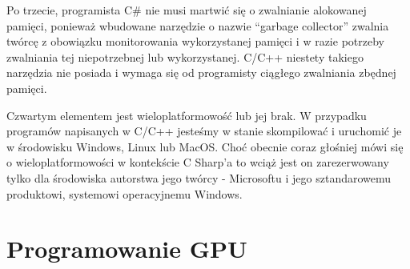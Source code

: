 \documentclass{article}
\begin{document}
	\par
	Po trzecie, programista C# nie musi martwić się o zwalnianie alokowanej pamięci, ponieważ wbudowane narzędzie o nazwie “garbage collector” zwalnia twórcę z obowiązku monitorowania wykorzystanej pamięci i w razie potrzeby zwalniania tej niepotrzebnej lub wykorzystanej. C/C++ niestety takiego narzędzia nie posiada i wymaga się od programisty ciągłego zwalniania zbędnej pamięci.
	\par
	Czwartym elementem jest wieloplatformowość lub jej brak. W przypadku programów napisanych w C/C++ jesteśmy w stanie skompilować i uruchomić je w środowisku Windows, Linux lub MacOS. Choć obecnie coraz głośniej mówi się o wieloplatformowości w kontekście C Sharp’a to wciąż jest on zarezerwowany tylko dla środowiska autorstwa jego twórcy - Microsoftu i jego sztandarowemu produktowi, systemowi operacyjnemu Windows.
	\section{Programowanie GPU}
\end{document}
